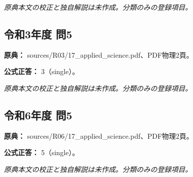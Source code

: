 \par\textit{原典本文の校正と独自解説は未作成。分類のみの登録項目。}

\subsection{令和3年度 問5}
\label{q:r03-reg-applied-05}

\noindent\textbf{原典：} sources/R03/17\_applied\_science.pdf、PDF物理2頁。

\textbf{公式正答：} 3（single）。

\par\textit{原典本文の校正と独自解説は未作成。分類のみの登録項目。}

\subsection{令和6年度 問5}
\label{q:r06-reg-applied-05}

\noindent\textbf{原典：} sources/R06/17\_applied\_science.pdf、PDF物理2頁。

\textbf{公式正答：} 5（single）。

\par\textit{原典本文の校正と独自解説は未作成。分類のみの登録項目。}
